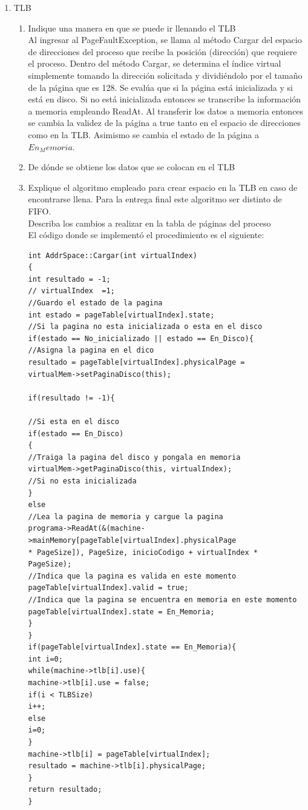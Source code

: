 \documentclass[11pt]{article}
\begin{document}
   \begin{enumerate}
     \item TLB
     \begin{enumerate}
       \item Indique una manera en que se puede ir llenando el TLB\\
       Al ingresar al PageFaultException, se llama al método Cargar del espacio de direcciones del proceso que recibe la posición (dirección) que requiere el proceso.
Dentro del método Cargar, se determina el índice virtual simplemente tomando la dirección solicitada y dividiéndolo por el tamaño de la página que es 128.
Se evalúa que si la página está inicializada y si está en disco. Si no está inicializada entonces se transcribe la información a memoria empleando ReadAt.
Al transferir los datos a memoria entonces se cambia la validez de la página a true tanto en el espacio de direcciones como en la TLB. Asimismo se cambia el estado de la página a $En_Memoria$.

       \item De dónde se obtiene los datos que se colocan en el TLB      
       \item Explique el algoritmo empleado para crear espacio en la TLB en caso de encontrarse llena. Para la entrega final este algoritmo ser distinto de FIFO. \\         Describa los cambios a realizar en la tabla de páginas del proceso\\
       El código donde se implementó el procedimiento es el siguiente:
        \begin{lstlisting}
int AddrSpace::Cargar(int virtualIndex)
{       
int resultado = -1;  
// virtualIndex  =1;
//Guardo el estado de la pagina
int estado = pageTable[virtualIndex].state;
//Si la pagina no esta inicializada o esta en el disco
if(estado == No_inicializado || estado == En_Disco){
//Asigna la pagina en el dico
resultado = pageTable[virtualIndex].physicalPage = 
virtualMem->setPaginaDisco(this);

if(resultado != -1){

//Si esta en el disco
if(estado == En_Disco)
{		
//Traiga la pagina del disco y pongala en memoria
virtualMem->getPaginaDisco(this, virtualIndex);
//Si no esta inicializada
}
else
//Lea la pagina de memoria y cargue la pagina
programa->ReadAt(&(machine->mainMemory[pageTable[virtualIndex].physicalPage
* PageSize]), PageSize, inicioCodigo + virtualIndex * PageSize);
//Indica que la pagina es valida en este momento
pageTable[virtualIndex].valid = true;
//Indica que la pagina se encuentra en memoria en este momento
pageTable[virtualIndex].state = En_Memoria;
}
}
if(pageTable[virtualIndex].state == En_Memoria){
int i=0;
while(machine->tlb[i].use){
machine->tlb[i].use = false;
if(i < TLBSize)
i++;
else
i=0;
}
machine->tlb[i] = pageTable[virtualIndex];
resultado = machine->tlb[i].physicalPage;
}
return resultado;
}
        \end{lstlisting}

     \end{enumerate}
   \end{enumerate}
\end{document}
